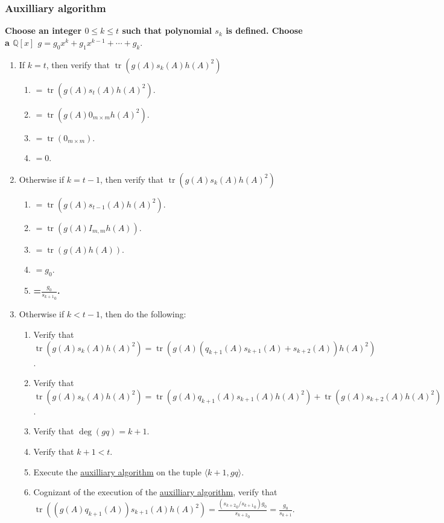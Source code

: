\documentclass[twocolumn]{article}
\DeclareMathOperator{\tr}{tr}
\begin{document}
			\subsubsection{Auxilliary algorithm}\label{sec:algorithm 47 auxilliary algorithm}
				\textbf{Choose an integer $0\le k\le t$ such that polynomial $s_k$ is defined. Choose a $\mathbb{Q}[x]$ $g=g_0x^k+g_1x^{k-1}+\cdots+g_k.$}
				\begin{enumerate}
					\item If $k=t$, then verify that $\tr(g(A)s_k(A)h(A)^2)$
					\begin{enumerate}
						\item $=\tr(g(A)s_t(A)h(A)^2)$.
						\item $=\tr(g(A)0_{m\times m}h(A)^2)$.
						\item $=\tr(0_{m\times m})$.
						\item $=0$.
					\end{enumerate}
					\item Otherwise if $k=t-1$, then verify that $\tr(g(A)s_k(A)h(A)^2)$
					\begin{enumerate}
						\item $=\tr(g(A)s_{t-1}(A)h(A)^2)$.
						\item $=\tr(g(A)I_{m,m}h(A))$.
						\item $=\tr(g(A)h(A))$.
						\item $=g_0$.
						\item \textbf{=$\frac{g_0}{{s_{k+1}}_0}$.}
					\end{enumerate}
					\item Otherwise if $k<t-1$, then do the following:
					\begin{enumerate}
						\item Verify that $\tr(g(A)s_k(A)h(A)^2)=\tr(g(A)(q_{k+1}(A)s_{k+1}(A)+s_{k+2}(A))h(A)^2)$.
						\item Verify that $\tr(g(A)s_k(A)h(A)^2)=\tr(g(A)q_{k+1}(A)s_{k+1}(A)h(A)^2)+\tr(g(A)s_{k+2}(A)h(A)^2)$.
						\item Verify that $\deg(gq)=k+1$.
						\item Verify that $k+1<t$.
						\item Execute the \hyperref[sec:algorithm 47 auxilliary algorithm]{auxilliary algorithm} on the tuple $\langle k+1, gq\rangle$.
						\item Cognizant of the execution of the \hyperref[sec:algorithm 47 auxilliary algorithm]{auxilliary algorithm}, verify that $\tr((g(A)q_{k+1}(A))s_{k+1}(A)h(A)^2)=\frac{({s_{k+2}}_0/{s_{k+1}}_0)g_0}{{s_{k+2}}_0}=\frac{g_0}{s_{k+1}}$.

\end{enumerate}
\end{enumerate}
\end{document}
